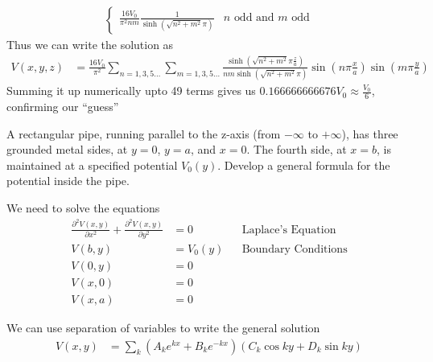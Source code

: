 \documentclass[../main.tex]{subfiles}
\begin{document}
\begin{questions}
\begin{parts}
\begin{solution}
\begin{align}
\begin{cases}
					\frac{16V_0}{\pi^2 nm}\frac{1}{\sinh(\sqrt{n^2+m^2}\pi)} & n \text{ odd and } m \text{ odd} 
				\end{cases}
			\end{align}
			Thus we can write the solution as
			\begin{align}
				V(x,y,z) &= \frac{16V_0}{\pi^2}\sum_{n=1,3,5\dots}\sum_{m=1,3,5\dots} \frac{\sinh(\sqrt{n^2+m^2}\pi\frac{z}{a})}{nm\sinh(\sqrt{n^2+m^2}\pi)}\sin(n\pi\frac{x}{a})\sin(m\pi\frac{y}{a})
			\end{align}
			Summing it up numerically upto 49 terms gives us $0.166666666676V_0 \approx \frac{V_0}{6}$, confirming our ``guess''
		\end{solution}
	\end{parts}

	\question A rectangular pipe, running parallel to the z-axis (from $-\infty$ to $+\infty$), has three grounded metal sides, at $y = 0$, $y = a$, and $x = 0$. The fourth side, at $x = b$, is maintained at a specified potential $V_0(y)$. Develop a general formula for the potential inside the pipe.

	\begin{solution}
		We need to solve the equations
		\begin{align}
			\frac{\partial^2 V(x,y)}{\partial x^2} + \frac{\partial^2 V(x,y)}{\partial y^2} &= 0 && \text{Laplace's Equation}\\
			V(b,y) &= V_0(y) && \text{Boundary Conditions}\label{eq:bc31}\\
			V(0,y) &= 0\label{eq:bc32}\\
			V(x,0) &= 0\label{eq:bc33}\\
			V(x,a) &= 0\label{eq:bc34}
		\end{align}

		We can use separation of variables to write the general solution
		\begin{align}
			V(x,y) &= \sum_k (A_k e^{kx} + B_k e^{-kx})(C_k\cos ky + D_k\sin ky)
		\end{align}


\end{solution}
\end{questions}
\end{document}
